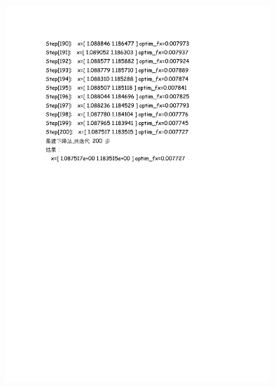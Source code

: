 \documentclass[UTF8]{ctexart}
\begin{document}
\begin{enumerate}
\begin{figure}[H]
\centering
\includegraphics[width=10cm]{fig/1_5.pdf}
\end{figure}


\end{enumerate}
\end{document}
